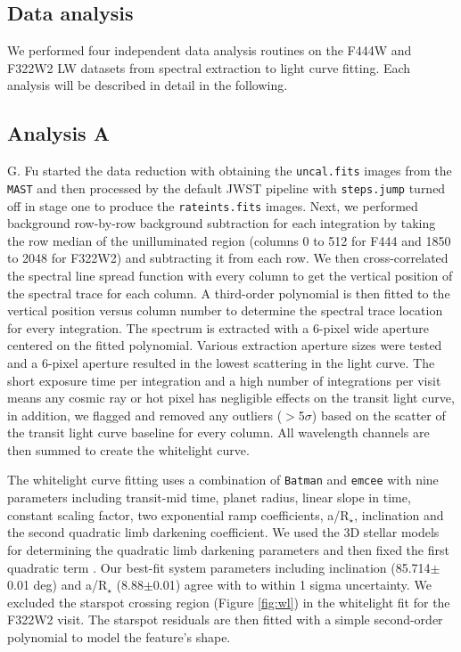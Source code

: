 \documentclass[sn-standardnature]{sn-jnl}%
\begin{document}
\subsection*{Data analysis}

We performed four independent data analysis routines on the F444W and F322W2 LW datasets from spectral extraction to light curve fitting. Each analysis will be described in detail in the following. 

\subsection*{Analysis A}

G. Fu started the data reduction with obtaining the \texttt{uncal.fits} images from the \texttt{MAST} and then processed by the default JWST pipeline with \texttt{steps.jump} turned off in stage one to produce the \texttt{rateints.fits} images. Next, we performed background row-by-row background subtraction  for each integration by taking the row median of the unilluminated region (columns 0 to 512 for F444 and 1850 to 2048 for F322W2) and subtracting it from each row. We then cross-correlated the spectral line spread function with every column to get the vertical position of the spectral trace for each column. A third-order polynomial is then fitted to the vertical position versus column number to determine the spectral trace location for every integration. The spectrum is extracted with a 6-pixel wide aperture centered on the fitted polynomial. Various extraction aperture sizes were tested and a 6-pixel aperture resulted in the lowest scattering in the light curve. The short exposure time per integration and a high number of integrations per visit means any cosmic ray or hot pixel has negligible effects on the transit light curve, in addition, we flagged and removed any outliers ($>$5$\sigma$) based on the scatter of the transit light curve baseline for every column. All wavelength channels are then summed to create the whitelight curve. 

The whitelight curve fitting uses a combination of \texttt{Batman}  and \texttt{emcee}  with nine parameters including transit-mid time, planet radius, linear slope in time, constant scaling factor, two exponential ramp coefficients, a/R$_\star$, inclination and the second quadratic limb darkening coefficient. We used the 3D stellar models  for determining the quadratic limb darkening parameters  and then fixed the first quadratic term . Our best-fit system parameters including inclination (85.714$\pm$0.01 deg) and a/R$_\star$ (8.88$\pm$0.01) agree with  to within 1 sigma uncertainty. We excluded the starspot crossing region (Figure \ref{fig:wl}) in the whitelight fit for the F322W2 visit. The starspot residuals are then fitted with a simple second-order polynomial to model the feature's shape.
\end{document}
